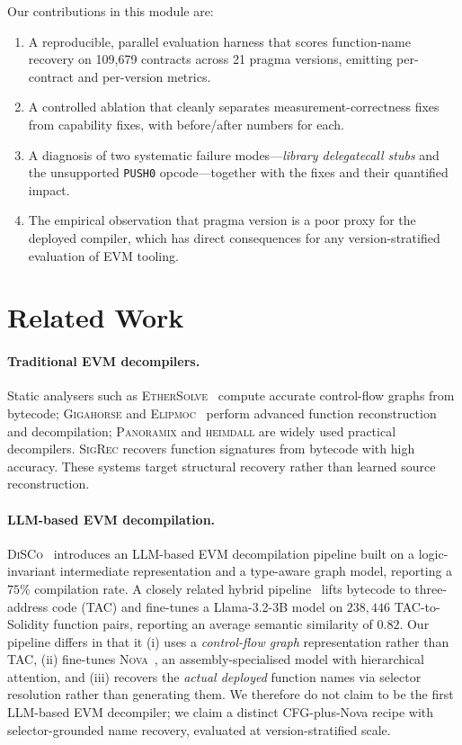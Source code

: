 \documentclass[10pt,conference]{article}
\begin{document}
Our contributions in this module are:
\begin{enumerate}
  \item A reproducible, parallel evaluation harness that scores function-name
        recovery on 109{,}679 contracts across 21 pragma versions, emitting
        per-contract and per-version metrics.
  \item A controlled ablation that cleanly separates measurement-correctness
        fixes from capability fixes, with before/after numbers for each.
  \item A diagnosis of two systematic failure modes---\emph{library
        delegatecall stubs} and the unsupported \texttt{PUSH0} opcode---together
        with the fixes and their quantified impact.
  \item The empirical observation that pragma version is a poor proxy for the
        deployed compiler, which has direct consequences for any version-stratified
        evaluation of EVM tooling.
\end{enumerate}

\section{Related Work}

\paragraph{Traditional EVM decompilers.}
Static analysers such as \textsc{EtherSolve}~\cite{ethersolve} compute accurate
control-flow graphs from bytecode; \textsc{Gigahorse} and
\textsc{Elipmoc}~\cite{elipmoc} perform advanced function reconstruction and
decompilation; \textsc{Panoramix} and \textsc{heimdall} are widely used practical
decompilers. \textsc{SigRec} recovers function signatures from bytecode with high
accuracy. These systems target structural recovery rather than learned source
reconstruction.

\paragraph{LLM-based EVM decompilation.}
\textsc{DiSCo}~\cite{disco} introduces an LLM-based EVM decompilation pipeline
built on a logic-invariant intermediate representation and a type-aware graph
model, reporting a $75\%$ compilation rate. A closely related hybrid
pipeline~\cite{llmdecompile2025} lifts bytecode to three-address code (TAC) and
fine-tunes a Llama-3.2-3B model on $238{,}446$ TAC-to-Solidity function pairs,
reporting an average semantic similarity of $0.82$. Our pipeline differs in that
it (i) uses a \emph{control-flow graph} representation rather than TAC, (ii)
fine-tunes \textsc{Nova}~\cite{nova}, an assembly-specialised model with
hierarchical attention, and (iii) recovers the \emph{actual deployed} function
names via selector resolution rather than generating them. We therefore do not
claim to be the first LLM-based EVM decompiler; we claim a distinct CFG-plus-Nova
recipe with selector-grounded name recovery, evaluated at version-stratified
scale.
\end{document}
